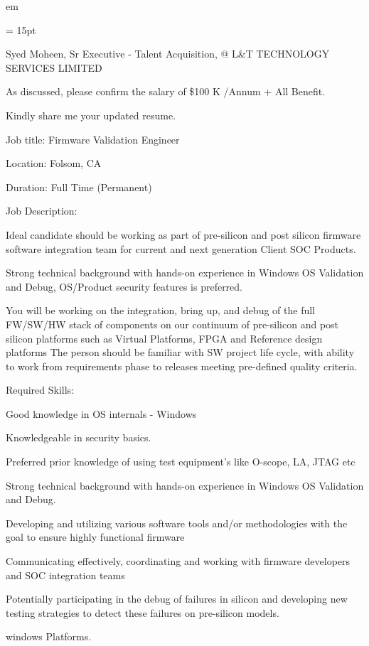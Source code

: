 

 em

\FFrg \baselineskip = 15pt



\centerline{
\FFrf 
Syed Moheen, Sr Executive - Talent Acquisition, @ L\&T TECHNOLOGY SERVICES LIMITED
} 

\par As discussed, please confirm the salary of \$100 K /Annum + All Benefit.
\par Kindly share me your updated resume.
\par Job title:                                  Firmware Validation Engineer
\par Location:                                 Folsom, CA
\par Duration:                                Full Time (Permanent)
\par Job Description:
\par Ideal candidate should be working as part of pre-silicon and post silicon firmware software integration team for current and next generation Client SOC Products.
\par Strong technical background with hands-on experience in Windows OS Validation and Debug, OS/Product security features is preferred.
\par You will be working on the integration, bring up, and debug of the full FW/SW/HW stack of components on our continuum of pre-silicon and post silicon platforms such as Virtual Platforms, FPGA and Reference design platforms The person should be familiar with SW project life cycle, with ability to work from requirements phase to releases meeting pre-defined quality criteria.
\par Required Skills:
\par Good knowledge in OS internals - Windows
\par Knowledgeable in security basics.
\par Preferred prior knowledge of using test equipment's like O-scope, LA, JTAG etc
\par Strong technical background with hands-on experience in Windows OS Validation and Debug.
\par Developing and utilizing various software tools and/or methodologies with the goal to ensure highly functional firmware
\par Communicating effectively, coordinating and working with firmware developers and SOC integration teams
\par Potentially participating in the debug of failures in silicon and developing new testing strategies to detect these failures on pre-silicon models.
\par windows Platforms.

\bye

